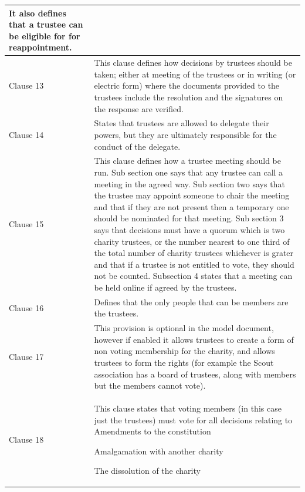 \documentclass{UoYCSproject}
\begin{document}
\begin{longtable}{|p{}|p{}|}
It also defines that a trustee can be eligible for for reappointment. \\\hline
  Clause 13 & 
          This clause defines how decisions by trustees should be taken; either at meeting of the trustees or in writing (or electric form) where the documents provided to the trustees include the resolution and the signatures on the response are verified. \\\hline
  Clause 14 & 
          States that trustees are allowed to delegate their powers, but they are ultimately responsible for the conduct of the delegate. \\\hline
  Clause 15 & 
          This clause defines how a trustee meeting should be run. Sub section one says that any trustee can call a meeting in the agreed way. Sub section two says that the trustee may appoint someone to chair the meeting and that if they are not present then a temporary one should be nominated for that meeting. Sub section 3 says that decisions must have a quorum which is two charity trustees, or the number nearest to one third of the total number of charity trustees whichever is grater and that if a trustee is not entitled to vote, they should not be counted. Subsection 4 states that a meeting can be held online if agreed by the trustees. \\\hline
  Clause 16 & 
          Defines that the only people that can be members are the trustees. \\\hline
  Clause 17 & 
          This provision is optional in the model document, however if enabled it allows trustees to create a form of non voting membership for the charity, and allows trustees to form the rights (for example the Scout association has a board of trustees, along with members but the members cannot vote). \\\hline
  Clause 18 & 
          This clause states that voting members (in this case just the trustees) must vote for all decisions relating to
Amendments to the constitution

Amalgamation with another charity

The dissolution of the charity


\end{longtable}
\end{document}
